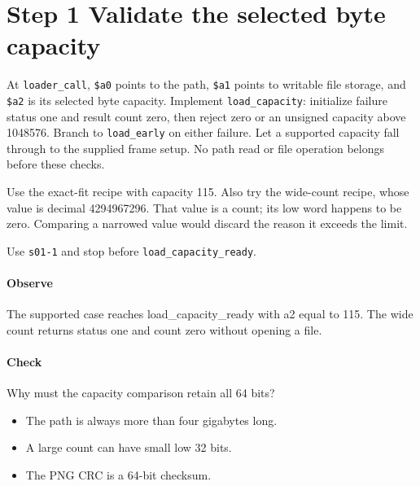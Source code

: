 \section{Step 1 Validate the selected byte capacity}\label{png-load-s01}
At \texttt{loader\_call}, \texttt{\$a0} points to the path, \texttt{\$a1} points to writable file storage, and \texttt{\$a2} is its selected byte capacity. Implement \texttt{load\_capacity}: initialize failure status one and result count zero, then reject zero or an unsigned capacity above 1048576. Branch to \texttt{load\_early} on either failure. Let a supported capacity fall through to the supplied frame setup. No path read or file operation belongs before these checks.

Use the exact-fit recipe with capacity 115. Also try the wide-count recipe, whose value is decimal 4294967296. That value is a count; its low word happens to be zero. Comparing a narrowed value would discard the reason it exceeds the limit.

Use \texttt{s01-1} and stop before \texttt{load\_capacity\_ready}.

\paragraph{Observe} The supported case reaches load\_capacity\_ready with a2 equal to 115. The wide count returns status one and count zero without opening a file.

\paragraph{Check} Why must the capacity comparison retain all 64 bits?
\begin{itemize}
\item[A.] The path is always more than four gigabytes long.
\item[B.] A large count can have small low 32 bits.
\item[C.] The PNG CRC is a 64-bit checksum.
\end{itemize}
